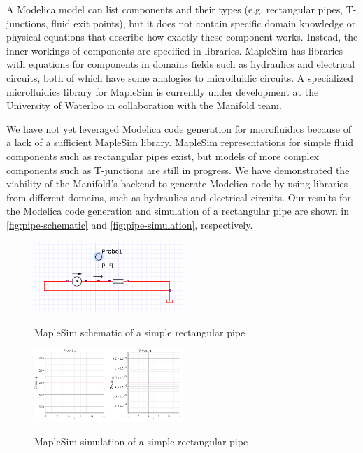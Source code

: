 A Modelica model can list components and their types (e.g. rectangular pipes, T-junctions, fluid exit points),
but it does not contain specific domain knowledge or physical equations that describe how exactly these
component works.
Instead, the inner workings of components are specified in libraries.
MapleSim has libraries with equations for components in domains fields such as hydraulics and electrical
circuits, both of which have some analogies to microfluidic circuits.
A specialized microfluidics library for MapleSim is currently under development at the University of Waterloo
in collaboration with the Manifold team.

We have not yet leveraged Modelica code generation for microfluidics because of a lack of a sufficient
MapleSim library.
MapleSim representations for simple fluid components such as rectangular pipes exist, but models of more complex components such as T-junctions are still in progress.
We have demonstrated the viability of the Manifold's backend to generate Modelica code by using
libraries from different domains, such as hydraulics and electrical circuits. Our results for the Modelica
code generation and simulation of a rectangular pipe are shown in \autoref{fig:pipe-schematic} and
\autoref{fig:pipe-simulation}, respectively.

\begin{figure}[!ht]
  \caption{MapleSim schematic of a simple rectangular pipe}
  \centering
    \includegraphics[width=0.5\textwidth]{img/simple-pipe.png}
	\label{fig:pipe-schematic}
\end{figure}
\begin{figure}[!ht]
  \caption{MapleSim simulation of a simple rectangular pipe}
  \centering
    \includegraphics[width=0.5\textwidth]{img/simple-pipe-simulation.png}
	\label{fig:pipe-simulation}
\end{figure}

